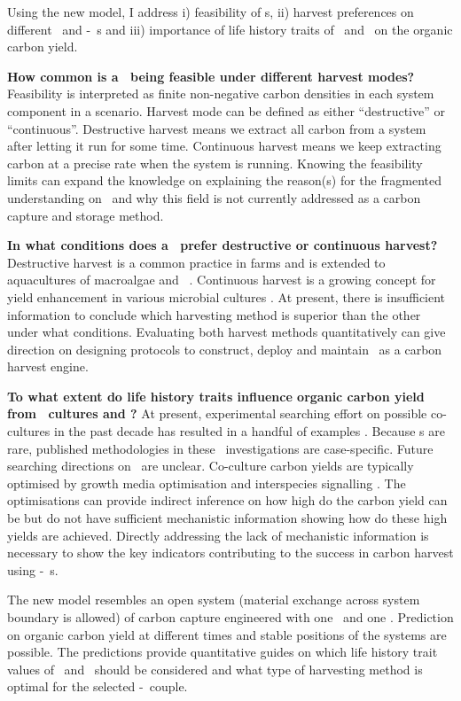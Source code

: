 \documentclass[../thesis.tex]{subfiles} %
\begin{document}
Using the new model, I address \Rn{1}) feasibility of \pbs s, \Rn{2}) harvest preferences on different \phy\ and \phy-\bac\ \pbs s and \Rn{3}) importance of life history traits of \phy\ and \bac\ on the organic carbon yield.

\textbf{How common is a \pbs\ being feasible under different harvest modes?}  Feasibility is interpreted as finite non-negative carbon densities in each system component in a scenario.  Harvest mode can be defined as either ``destructive” or ``continuous”.  Destructive harvest means we extract all carbon from a system after letting it run for some time.  Continuous harvest means we keep extracting carbon at a precise rate when the system is running.  Knowing the feasibility limits can expand the knowledge on explaining the reason(s) for the fragmented understanding \autocite{fuentes2016impact} on \pbs\ and why this field is not currently addressed as a carbon capture and storage method.

\textbf{In what conditions does a \pbs\ prefer destructive or continuous harvest?}  Destructive harvest is a common practice in farms and is extended to aquacultures of macroalgae \autocite{duarte2017can} and \phy\  \autocite{evanson_2019}.  Continuous harvest is a growing concept for yield enhancement in various microbial cultures \autocite{aytekin2016statistical,fuentes2016impact}.  At present, there is insufficient information to conclude which harvesting method is superior than the other under what conditions.  Evaluating both harvest methods quantitatively can give direction on designing protocols to construct, deploy and maintain \pbs\ as a carbon harvest engine.

\textbf{To what extent do life history traits influence organic carbon yield from \phy\ cultures and \pbs?}  At present, experimental searching effort on possible co-cultures in the past decade has resulted in a handful of examples \autocite{fuentes2016impact,santos2014microalgal}.  Because \pbs s are rare, published methodologies in these \pbs\ investigations are case-specific.  Future searching directions on \pbs\ are unclear.  Co-culture carbon yields are typically optimised by growth media optimisation \autocite{aytekin2016statistical,fuentes2016impact} and interspecies signalling \autocite{fuentes2016impact}.  The optimisations can provide indirect inference on how high do the carbon yield can be but do not have sufficient mechanistic information showing how do these high yields are achieved.  Directly addressing the lack of mechanistic information is necessary to show the key indicators contributing to the success in carbon harvest using \phy-\bac\ \pbs s.

The new model resembles an open system (material exchange across system boundary is allowed) of carbon capture engineered with one \phy\ and one \bacm.  Prediction on organic carbon yield at different times and stable positions of the systems are possible.  The predictions provide quantitative guides on which life history trait values of \phy\ and \bac\ should be considered and what type of harvesting method is optimal for the selected \phy-\bac\ couple.
\end{document}
